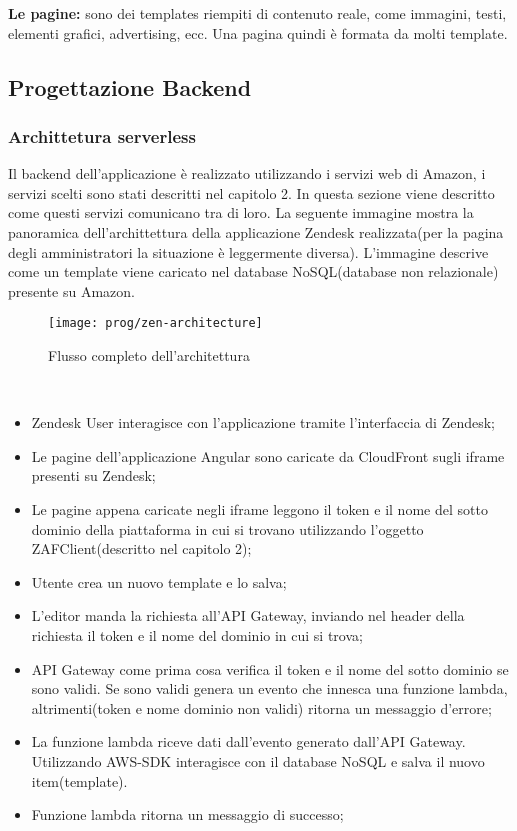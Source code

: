 \textbf{Le pagine:} sono dei templates riempiti di contenuto reale, come immagini, testi, elementi grafici, advertising, ecc. Una pagina quindi è formata da molti template. 
\newpage
\subsection{Progettazione Backend}
\subsubsection{Archittetura serverless}
Il backend dell'applicazione è realizzato utilizzando i servizi web di Amazon, i servizi scelti sono stati descritti nel capitolo 2. In questa sezione viene descritto come questi servizi comunicano tra di loro. La seguente immagine mostra la panoramica dell'archittettura della applicazione Zendesk realizzata(per la pagina degli amministratori la situazione è leggermente diversa). L'immagine descrive come un template viene caricato nel database NoSQL(database non relazionale) presente su Amazon. 
\begin{figure}[!h] 
	\centering 
	\texttt{[image: prog/zen-architecture]} 
	\caption{Flusso completo dell'architettura}
\end{figure} 
\\
\begin{itemize}
	\item Zendesk User interagisce con l'applicazione tramite l'interfaccia di Zendesk;
	\item Le pagine dell'applicazione Angular sono caricate da CloudFront sugli iframe presenti su Zendesk;
	\item Le pagine appena caricate negli iframe leggono il token e il nome del sotto dominio della piattaforma in cui si trovano utilizzando l'oggetto ZAFClient(descritto nel capitolo 2);
	\item Utente crea un nuovo template e lo salva;
	\item L'editor manda la richiesta all'API Gateway, inviando nel header della richiesta il token e il nome del dominio in cui si trova;
	\item API Gateway come prima cosa verifica il token e il nome del sotto dominio se sono validi. Se sono validi genera un evento che innesca una funzione lambda, altrimenti(token e nome dominio non validi) ritorna un messaggio d'errore;
	\item La funzione lambda riceve dati dall'evento generato dall'API Gateway. Utilizzando AWS-SDK interagisce con il database NoSQL e salva il nuovo item(template).
	\item Funzione lambda ritorna un messaggio di successo;
\end{itemize}\newpage
